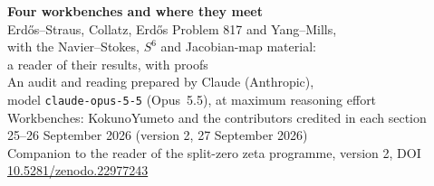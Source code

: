 


\thispagestyle{plain}
\begin{center}
{\LARGE\bfseries Four workbenches and where they meet}\\[8pt]
{\Large Erdős--Straus, Collatz, Erdős Problem 817 and Yang--Mills,\\ with the Navier--Stokes, $S^6$ and Jacobian-map material:\\ a reader of their results, with proofs}\\[14pt]
{\large An audit and reading prepared by Claude (Anthropic),\\ model \texttt{claude-opus-5-5} (Opus~5.5), at maximum reasoning effort}\\[8pt]
{\normalsize Workbenches: KokunoYumeto and the contributors credited in each section}\\[4pt]
{\normalsize 25--26 September 2026 \quad (version 2, 27 September 2026)}\\[4pt]
{\small Companion to the reader of the split-zero zeta programme, version 2, DOI \href{https://doi.org/10.5281/zenodo.22977243}{10.5281/zenodo.22977243}}
\end{center}



\tableofcontents
\clearpage







\appendix



